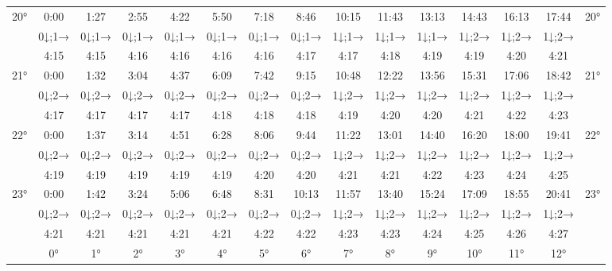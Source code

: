 \begin{scriptsize}
\begin{tabular}{c || c | c | c | c | c | c | c | c | c | c | c | c | c || c}
		\multirow{3}{*}{20°}&0:00&1:27&2:55&4:22&5:50&7:18&8:46&10:15&11:43&13:13&14:43&16:13&17:44&\multirow{3}{*}{20°}\\ \space&0↓;1→&0↓;1→&0↓;1→&0↓;1→&0↓;1→&0↓;1→&0↓;1→&1↓;1→&1↓;1→&1↓;1→&1↓;2→&1↓;2→&1↓;2→&\space\\&4:15&4:15&4:16&4:16&4:16&4:16&4:17&4:17&4:18&4:19&4:19&4:20&4:21&\space\\\hline
		\multirow{3}{*}{21°}&0:00&1:32&3:04&4:37&6:09&7:42&9:15&10:48&12:22&13:56&15:31&17:06&18:42&\multirow{3}{*}{21°}\\ \space&0↓;2→&0↓;2→&0↓;2→&0↓;2→&0↓;2→&0↓;2→&0↓;2→&1↓;2→&1↓;2→&1↓;2→&1↓;2→&1↓;2→&1↓;2→&\space\\&4:17&4:17&4:17&4:17&4:18&4:18&4:18&4:19&4:20&4:20&4:21&4:22&4:23&\space\\\hline
		\multirow{3}{*}{22°}&0:00&1:37&3:14&4:51&6:28&8:06&9:44&11:22&13:01&14:40&16:20&18:00&19:41&\multirow{3}{*}{22°}\\ \space&0↓;2→&0↓;2→&0↓;2→&0↓;2→&0↓;2→&0↓;2→&0↓;2→&1↓;2→&1↓;2→&1↓;2→&1↓;2→&1↓;2→&1↓;2→&\space\\&4:19&4:19&4:19&4:19&4:19&4:20&4:20&4:21&4:21&4:22&4:23&4:24&4:25&\space\\\hline
		\multirow{3}{*}{23°}&0:00&1:42&3:24&5:06&6:48&8:31&10:13&11:57&13:40&15:24&17:09&18:55&20:41&\multirow{3}{*}{23°}\\ \space&0↓;2→&0↓;2→&0↓;2→&0↓;2→&0↓;2→&0↓;2→&0↓;2→&1↓;2→&1↓;2→&1↓;2→&1↓;2→&1↓;2→&1↓;2→&\space\\&4:21&4:21&4:21&4:21&4:21&4:22&4:22&4:23&4:23&4:24&4:25&4:26&4:27&\space\\\hline
		\hline\space &0°&1°&2°&3°&4°&5°&6°&7°&8°&9°&10°&11°&12°
\end{tabular}\end{scriptsize}

